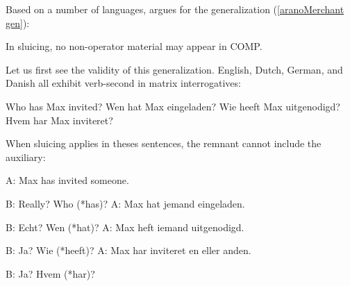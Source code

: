 \documentclass[output=paper]{langscibook}
\begin{document}
Based on a number of languages, \citet[62]{Merchant2001The-syntax-of-s} argues for the generalization (\ref{aranoMerchant gen}):


\ea \upshape \label{aranoMerchant gen}
In sluicing, no non-operator material may appear in COMP.
\z 

\noindent Let us first see the validity of this generalization. English, Dutch, German, and Danish all exhibit verb-second in matrix interrogatives:

\ea 
\settowidth\jamwidth{} 
\ea Who has Max invited? \jambox{\upshape[English]}
\ex Wen hat Max eingeladen? \jambox{\upshape[German]}
\ex Wie heeft  Max uitgenodigd?  \jambox{\upshape[Dutch]}
\ex Hvem har Max inviteret? \jambox{\upshape[Danish]}

 \upshape \citep[63]{Merchant2001The-syntax-of-s}
\z 
\z


\noindent When sluicing applies in theses sentences, the remnant cannot include the auxiliary:

\ea \label{aranosluice aux}
\settowidth\jamwidth{} 
\ea \textup{A:} Max has invited someone. 

\textup{B:} Really? Who \textup{(*}has\textup{)}? \jambox{\upshape[English]}
\ex \textup{A:} Max hat jemand eingeladen. 

\textup{B:} Echt? Wen \textup{(*}hat\textup{)}?\jambox{\upshape[German]}
\ex \textup{A:} Max heft iemand uitgenodigd.

\textup{B:} Ja? Wie \textup{(*}heeft\textup{)}? \jambox{\upshape[Dutch]}
\ex \textup{A:} Max har inviteret en eller anden.

\textup{B:} Ja? Hvem \textup{(*}har\textup{)}? \jambox{\upshape[Danish]}

 \upshape \citep[63]{Merchant2001The-syntax-of-s}
\z 
\z
\end{document}
